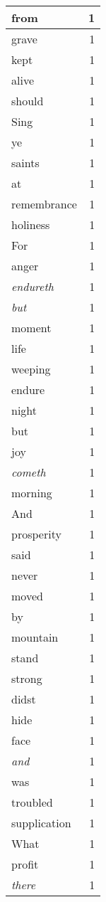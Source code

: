 \begin{center}
\begin{longtable}{l|r}
from & 1 \\ \hline
grave & 1 \\ \hline
kept & 1 \\ \hline
alive & 1 \\ \hline
should & 1 \\ \hline
Sing & 1 \\ \hline
ye & 1 \\ \hline
saints & 1 \\ \hline
at & 1 \\ \hline
remembrance & 1 \\ \hline
holiness & 1 \\ \hline
For & 1 \\ \hline
anger & 1 \\ \hline
\emph{endureth} & 1 \\ \hline
\emph{but} & 1 \\ \hline
moment & 1 \\ \hline
life & 1 \\ \hline
weeping & 1 \\ \hline
endure & 1 \\ \hline
night & 1 \\ \hline
but & 1 \\ \hline
joy & 1 \\ \hline
\emph{cometh} & 1 \\ \hline
morning & 1 \\ \hline
And & 1 \\ \hline
prosperity & 1 \\ \hline
said & 1 \\ \hline
never & 1 \\ \hline
moved & 1 \\ \hline
by & 1 \\ \hline
mountain & 1 \\ \hline
stand & 1 \\ \hline
strong & 1 \\ \hline
didst & 1 \\ \hline
hide & 1 \\ \hline
face & 1 \\ \hline
\emph{and} & 1 \\ \hline
was & 1 \\ \hline
troubled & 1 \\ \hline
supplication & 1 \\ \hline
What & 1 \\ \hline
profit & 1 \\ \hline
\emph{there} & 1 \\ \hline

\end{longtable}
\end{center}
